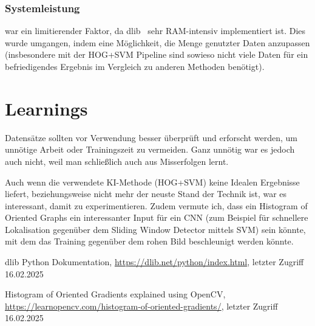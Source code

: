\documentclass[runningheads]{llncs}
\begin{document}
\subsubsection{Systemleistung} war ein limitierender Faktor, da dlib~\cite{ref_dlib_docs} sehr RAM-intensiv implementiert ist. Dies wurde umgangen, indem eine Möglichkeit, die Menge genutzter Daten anzupassen (insbesondere mit der HOG+SVM Pipeline sind sowieso nicht viele Daten für ein befriedigendes Ergebnis im Vergleich zu anderen Methoden benötigt).

\section{Learnings}
Datensätze sollten vor Verwendung besser überprüft und erforscht werden, um unnötige Arbeit oder Trainingszeit zu vermeiden. Ganz unnötig war es jedoch auch nicht, weil man schließlich auch aus Misserfolgen lernt.

Auch wenn die verwendete KI-Methode (HOG+SVM) keine Idealen Ergebnisse liefert, beziehungsweise nicht mehr der neuste Stand der Technik ist, war es interessant, damit zu experimentieren. Zudem vermute ich, dass ein Histogram of Oriented Graphs ein interessanter Input für ein CNN (zum Beispiel für schnellere Lokalisation gegenüber dem Sliding Window Detector mittels SVM) sein könnte, mit dem das Training gegenüber dem rohen Bild beschleunigt werden könnte.

\begin{thebibliography}{8}
  dlib Python Dokumentation, \url{https://dlib.net/python/index.html}, letzter Zugriff 16.02.2025

  Histogram of Oriented Gradients explained using OpenCV, \url{https://learnopencv.com/histogram-of-oriented-gradients/}, letzter Zugriff 16.02.2025
\end{thebibliography}
\end{document}
